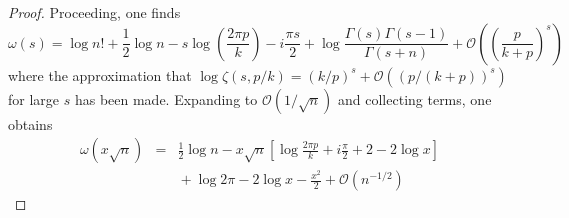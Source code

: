 \documentclass{amsart}
\def\ds{\displaystyle}
\begin{document}
\begin{proof}
Proceeding, one finds 
\begin{equation*}
\omega(s)=\log n!+\frac{1}{2}\log n
-s\log\left(\frac{2\pi p}{k}\right)-i\frac{\pi s}{2}
+\log\frac{\Gamma(s)\Gamma(s-1)}{\Gamma(s+n)}
+\mathcal{O}\left( \left(\frac{p}{k+p}\right)^s \right)
\end{equation*}
 where the approximation that 
$\log \zeta\left(s,p/k\right)=(k/p)^{s}+\mathcal{O}\left( (p/(k+p))^s \right)$
for large $s$ has been made. 
Expanding to $\mathcal{O}(1/\sqrt{n})$
and collecting terms, one obtains 
\begin{equation}\begin{array}{lll}
\omega(x\sqrt{n}) & = & \ds \frac{1}{2}\log n
-x\sqrt{n}\left[\log\frac{2\pi p}{k}+i\frac{\pi}{2}+2-2\log x\right] \\
 &  & \ds  {} +\log2\pi-2\log x-\frac{x^{2}}{2}+\mathcal{O}\left(n^{-1/2}\right) 
\end{array}
\end{equation}


\end{proof}
\end{document}
